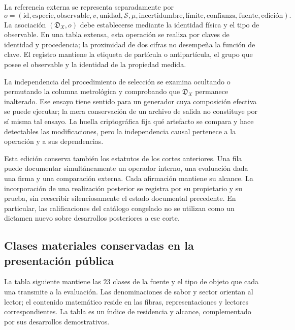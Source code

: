 La referencia externa se representa separadamente por
\[
 o=(\mathrm{id},\mathrm{especie},\mathrm{observable},
      v,\mathrm{unidad},\mathscr S,\mu,
      \mathrm{incertidumbre},\mathrm{límite},\mathrm{confianza},
      \mathrm{fuente},\mathrm{edición}).
\]
La asociación \((\mathfrak D_X,o)\) debe establecerse mediante la
identidad física y el tipo de observable. En una tabla extensa, esta
operación se realiza por claves de identidad y procedencia; la proximidad
de dos cifras no desempeña la función de clave. El registro mantiene la
etiqueta de partícula o antipartícula, el grupo que posee el observable y
la identidad de la propiedad medida.

La independencia del procedimiento de selección se examina ocultando o
permutando la columna metrológica y comprobando que \(\mathfrak D_X\)
permanece inalterado. Ese ensayo tiene sentido para un generador cuya
composición efectiva se puede ejecutar; la mera conservación de un archivo
de salida no constituye por sí misma tal ensayo. La huella criptográfica
fija qué artefacto se compara y hace detectables las modificaciones, pero
la independencia causal pertenece a la operación y a sus dependencias.

Esta edición conserva también los estatutos de los cortes anteriores.
Una fila puede documentar simultáneamente un operador interno, una
evaluación dada una firma y una comparación externa. Cada afirmación
mantiene su alcance. La incorporación de una realización posterior se
registra por su propietario y su prueba, sin reescribir silenciosamente el
estado documental precedente. En particular, las calificaciones del
catálogo congelado no se utilizan como un dictamen nuevo sobre desarrollos
posteriores a ese corte.

\subsection{Clases materiales conservadas en la presentación pública}

La tabla siguiente mantiene las \(23\) clases de la fuente y el tipo de
objeto que cada una transmite a la evaluación. Las denominaciones de sabor
y sector orientan al lector; el contenido matemático reside en las fibras,
representaciones y lectores correspondientes. La tabla es un índice de
residencia y alcance, complementado por sus desarrollos demostrativos.

